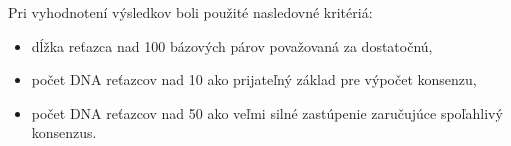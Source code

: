 Pri vyhodnotení výsledkov boli použité nasledovné kritériá:
\begin{itemize}
    \item dĺžka reťazca nad 100 bázových párov považovaná za dostatočnú,
    \item počet DNA reťazcov nad 10 ako prijateľný základ pre výpočet konsenzu,
    \item počet DNA reťazcov nad 50 ako veľmi silné zastúpenie zaručujúce spoľahlivý konsenzus.
\end{itemize}
